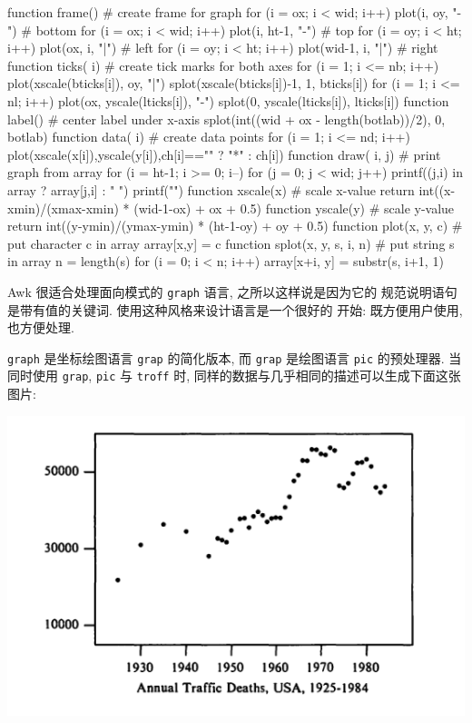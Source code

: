 \begin{awkcode}
    function frame() {        # create frame for graph
        for (i = ox; i < wid; i++) plot(i, oy, "-")     # bottom
        for (i = ox; i < wid; i++) plot(i, ht-1, "-")   # top
        for (i = oy; i < ht; i++) plot(ox, i, "|")      # left
        for (i = oy; i < ht; i++) plot(wid-1, i, "|")   # right
    }
    function ticks(    i) {   # create tick marks for both axes
        for (i = 1; i <= nb; i++) {
            plot(xscale(bticks[i]), oy, "|")
            splot(xscale(bticks[i])-1, 1, bticks[i])
        }
        for (i = 1; i <= nl; i++) {
            plot(ox, yscale(lticks[i]), "-")
            splot(0, yscale(lticks[i]), lticks[i])
        }
    }
    function label() {        # center label under x-axis
        splot(int((wid + ox - length(botlab))/2), 0, botlab)
    }
    function data(    i) {    # create data points
        for (i = 1; i <= nd; i++)
            plot(xscale(x[i]),yscale(y[i]),ch[i]=="" ? "*" : ch[i])
    }
    function draw(    i, j) { # print graph from array
        for (i = ht-1; i >= 0; i--) {
            for (j = 0; j < wid; j++)
                printf((j,i) in array ? array[j,i] : " ")
            printf("\n")
        }
    }
    function xscale(x) {      # scale x-value
        return int((x-xmin)/(xmax-xmin) * (wid-1-ox) + ox + 0.5)
    }
    function yscale(y) {      # scale y-value
        return int((y-ymin)/(ymax-ymin) * (ht-1-oy) + oy + 0.5)
    }
    function plot(x, y, c) {  # put character c in array
        array[x,y] = c
    }
    function splot(x, y, s,    i, n) { # put string s in array
        n = length(s)
        for (i = 0; i < n; i++)
            array[x+i, y] = substr(s, i+1, 1)
    }
\end{awkcode}

Awk 很适合处理面向模式的 \texttt{graph} 语言, 之所以这样说是因为它的
规范说明语句是带有值的关键词. 使用这种风格来设计语言是一个很好的
开始: 既方便用户使用, 也方便处理.

\texttt{graph} 是坐标绘图语言 \texttt{grap} 的简化版本, 而 \texttt{grap}
是绘图语言 \texttt{pic} 的预处理器. 
 当同时使用 \texttt{grap}, \texttt{pic} 与 \texttt{troff}
时, 同样的数据与几乎相同的描述可以生成下面这张图片:
\begin{center}
    \includegraphics[scale=0.7]{./images/traffic_deaths.png}
\end{center}

